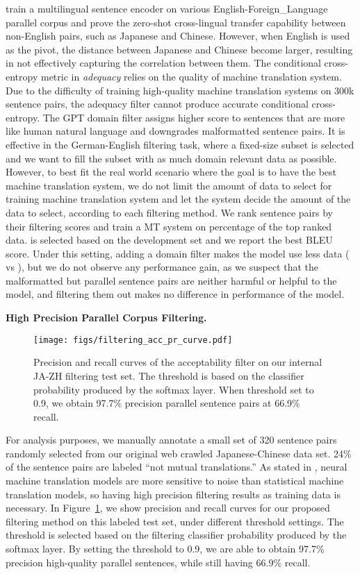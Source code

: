 \documentclass[11pt,a4paper]{article}
\begin{document}
\citet{chaudhary2019low} train a multilingual sentence encoder on various English-Foreign\_Language parallel corpus and prove the zero-shot cross-lingual transfer capability between non-English pairs, such as Japanese and Chinese. 
However, when English is used as the pivot, the distance between Japanese and Chinese become larger, resulting in not effectively capturing the correlation between them.
The conditional cross-entropy metric in {\em adequacy} relies on the quality of machine translation system. Due to the difficulty of training high-quality machine translation systems on 300k sentence pairs, the adequacy filter cannot produce accurate conditional cross-entropy. The GPT domain filter assigns higher score to sentences that are more like human natural language and downgrades malformatted sentence pairs. It is effective in the German-English filtering task, where a fixed-size subset is selected and we want to fill the subset with as much domain relevant data as possible. However, to best fit the real world scenario where the goal is to have the best machine translation system, we do not limit the amount of data to select for training machine translation system and let the system decide the amount of the data to select, according to each filtering method. 
We rank sentence pairs by their filtering scores and train a MT system on  percentage of the top ranked data.  is selected based on the development set and we report the best BLEU score.
Under this setting, adding a domain filter makes the model use less data ( vs ), but we do not observe any performance gain, as we suspect that the malformatted but parallel sentence pairs are neither harmful or helpful to the model, and filtering them out makes no difference in performance of the model.





\textbf{High Precision Parallel Corpus Filtering.} 
\begin{figure}\centering
    \texttt{[image: figs/filtering\_acc\_pr\_curve.pdf]}
    \caption{Precision and recall curves of the acceptability filter on our internal JA-ZH filtering test set. The threshold is based on the classifier probability produced by the softmax layer. When threshold set to 0.9, we obtain 97.7\% precision parallel sentence pairs at 66.9\% recall.}
    \label{fig:filtering_acc_pr_curve}
\end{figure}
For analysis purposes, we manually annotate a small set of 320 sentence pairs randomly selected from our original web crawled Japanese-Chinese data set. 24\% of the sentence pairs are labeled ``not mutual translations.''  As stated in \citet{khayrallah2018impact}, neural machine translation models are more sensitive to noise than statistical machine translation models, so having high precision filtering results as training data is necessary.
In Figure~\ref{fig:filtering_acc_pr_curve}, we show precision and recall curves for our proposed filtering method on this labeled test set, under different threshold settings. The threshold is selected based on the filtering classifier probability produced by the softmax layer. 
By setting the threshold to 0.9, we are able to obtain 97.7\% precision high-quality parallel sentences, while still having 66.9\% recall.
\end{document}
